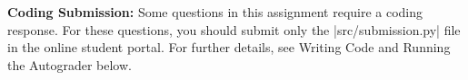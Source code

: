 {\bf Coding Submission:}
Some questions in this assignment require a coding response.  For these questions, you should submit only the |src/submission.py| file in the online student portal.  For further details, see Writing Code and Running the Autograder below.
